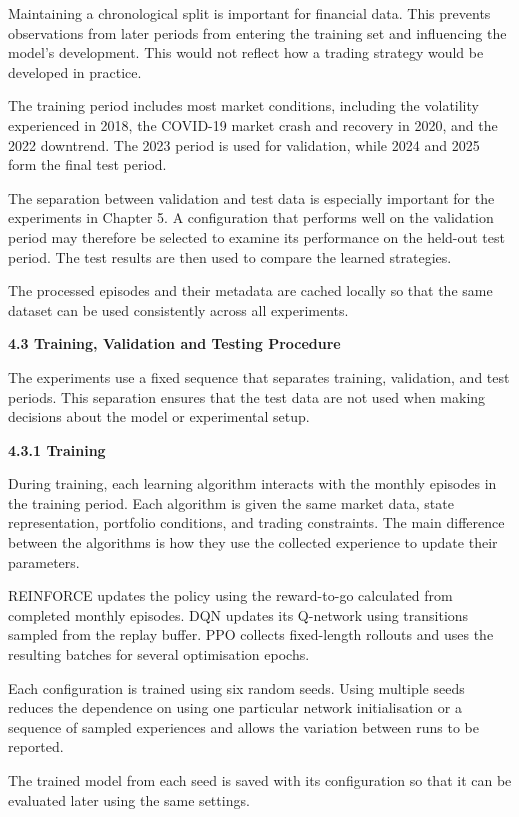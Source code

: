 Maintaining a chronological split is important for financial data. This
prevents observations from later periods from entering the training set
and influencing the model's development. This would not reflect how a
trading strategy would be developed in practice.

The training period includes most market conditions, including the
volatility experienced in 2018, the COVID-19 market crash and recovery
in 2020, and the 2022 downtrend. The 2023 period is used for validation,
while 2024 and 2025 form the final test period.

The separation between validation and test data is especially important
for the experiments in Chapter 5. A configuration that performs well on
the validation period may therefore be selected to examine its
performance on the held-out test period. The test results are then used
to compare the learned strategies.

The processed episodes and their metadata are cached locally so that the
same dataset can be used consistently across all experiments.

\textbf{4.3 Training, Validation and Testing Procedure}

The experiments use a fixed sequence that separates training,
validation, and test periods. This separation ensures that the test data
are not used when making decisions about the model or experimental
setup.

\textbf{4.3.1 Training}

During training, each learning algorithm interacts with the monthly
episodes in the training period. Each algorithm is given the same market
data, state representation, portfolio conditions, and trading
constraints. The main difference between the algorithms is how they use
the collected experience to update their parameters.

REINFORCE updates the policy using the reward-to-go calculated from
completed monthly episodes. DQN updates its Q-network using transitions
sampled from the replay buffer. PPO collects fixed-length rollouts and
uses the resulting batches for several optimisation epochs.

Each configuration is trained using six random seeds. Using multiple
seeds reduces the dependence on using one particular network
initialisation or a sequence of sampled experiences and allows the
variation between runs to be reported.

The trained model from each seed is saved with its configuration so that
it can be evaluated later using the same settings.

